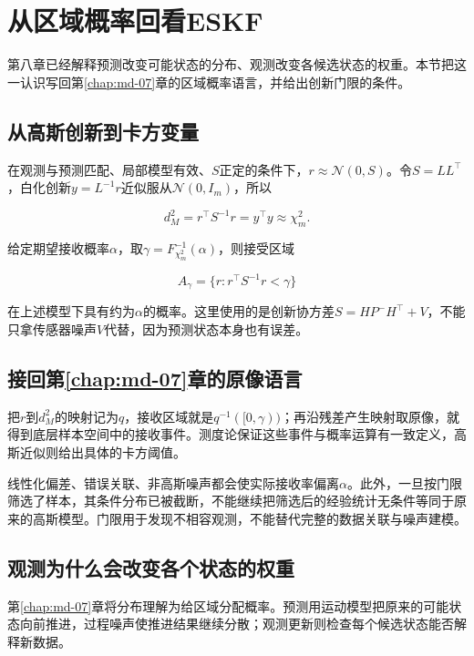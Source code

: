 \section{从区域概率回看ESKF}

第八章已经解释预测改变可能状态的分布、观测改变各候选状态的权重。本节把这一认识写回第\ref{chap:md-07}章的区域概率语言，并给出创新门限的条件。

\subsection{从高斯创新到卡方变量}

在观测与预测匹配、局部模型有效、$S$正定的条件下，$r\approx\mathcal N(0,S)$。令$S=LL^\top$，白化创新$y=L^{-1}r$近似服从$\mathcal N(0,I_m)$，所以

\begin{equation*}
d_M^2=r^\top S^{-1}r=y^\top y\approx\chi_m^2.
\end{equation*}

给定期望接收概率$\alpha$，取$\gamma=F_{\chi_m^2}^{-1}(\alpha)$，则接受区域

\begin{equation*}
A_\gamma=\{r:r^\top S^{-1}r<\gamma\}
\end{equation*}

在上述模型下具有约为$\alpha$的概率。这里使用的是创新协方差$S=HP^-H^\top+V$，不能只拿传感器噪声$V$代替，因为预测状态本身也有误差。

\subsection{接回第\ref{chap:md-07}章的原像语言}

把$r$到$d_M^2$的映射记为$q$，接收区域就是$q^{-1}([0,\gamma))$；再沿残差产生映射取原像，就得到底层样本空间中的接收事件。测度论保证这些事件与概率运算有一致定义，高斯近似则给出具体的卡方阈值。

线性化偏差、错误关联、非高斯噪声都会使实际接收率偏离$\alpha$。此外，一旦按门限筛选了样本，其条件分布已被截断，不能继续把筛选后的经验统计无条件等同于原来的高斯模型。门限用于发现不相容观测，不能替代完整的数据关联与噪声建模。

\subsection{观测为什么会改变各个状态的权重}

第\ref{chap:md-07}章将分布理解为给区域分配概率。预测用运动模型把原来的可能状态向前推进，过程噪声使推进结果继续分散；观测更新则检查每个候选状态能否解释新数据。

